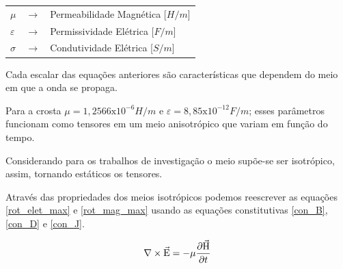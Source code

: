 	        {\footnotesize \noindent
            
            \begin{table}[H]
             \begin{tabular*}{1cm}{p{0.05cm}p{0.1cm}p{10cm}}
               {\footnotesize $\mu$}  & {\footnotesize $\rightarrow$} & {\footnotesize Permeabilidade Magnética [$H/m$] }\\
               {\footnotesize $\varepsilon$}  & {\footnotesize $\rightarrow$} & {\footnotesize Permissividade Elétrica [$F/m$] }\\
               {\footnotesize $\sigma$}  & {\footnotesize $\rightarrow$} & {\footnotesize Condutividade Elétrica [$S/m$]} \\
             \end{tabular*}

            \end{table}}
	    
	    
	    
	    
	    
	    
	    
	    
	    
            Cada escalar das equações anteriores são características que dependem do meio em que a onda se propaga.
	    
            Para a crosta $\mu = 1,2566\textrm{x}10^{-6} H/m$ e $\varepsilon = 8,85
            \textrm{x}10^{-12} F/m$; esses parâmetros funcionam como tensores em um meio
            anisotrópico que variam em função do tempo.
            
            Considerando para os 
            trabalhos de investigação o meio supõe-se ser isotrópico, assim, 
            tornando estáticos os tensores.
	
            Através das propriedades dos meios isotrópicos podemos reescrever as equações \ref{rot_elet_max} e \ref{rot_mag_max} usando as equações constitutivas \ref{con_B}, \ref{con_D} e \ref{con_J}.
            
            \begin{equation}
                \label{rot_elet_con}
                \nabla \times \vec{\textrm{E}} = - \mu \dfrac{\partial \vec{\textrm{H}}}{\partial t}
            \end{equation}
            
